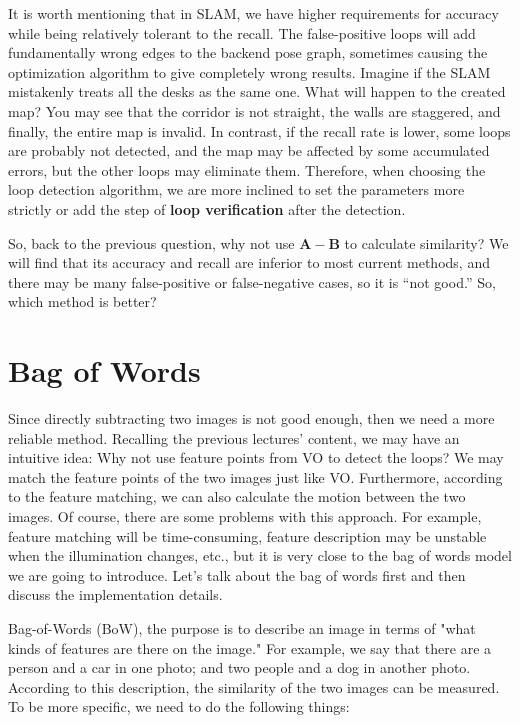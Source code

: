 It is worth mentioning that in SLAM, we have higher requirements for accuracy while being relatively tolerant to the recall. The false-positive loops will add fundamentally wrong edges to the backend pose graph, sometimes causing the optimization algorithm to give completely wrong results. Imagine if the SLAM mistakenly treats all the desks as the same one. What will happen to the created map? You may see that the corridor is not straight, the walls are staggered, and finally, the entire map is invalid. In contrast, if the recall rate is lower, some loops are probably not detected, and the map may be affected by some accumulated errors, but the other loops may eliminate them. Therefore, when choosing the loop detection algorithm, we are more inclined to set the parameters more strictly or add the step of \textbf{loop verification} after the detection.

So, back to the previous question, why not use $\mathbf{A}-\mathbf{B}$ to calculate similarity? We will find that its accuracy and recall are inferior to most current methods, and there may be many false-positive or false-negative cases, so it is ``not good.'' So, which method is better?

\section{Bag of Words}
Since directly subtracting two images is not good enough, then we need a more reliable method. Recalling the previous lectures' content, we may have an intuitive idea: Why not use feature points from VO to detect the loops? We may match the feature points of the two images just like VO. Furthermore, according to the feature matching, we can also calculate the motion between the two images. Of course, there are some problems with this approach. For example, feature matching will be time-consuming, feature description may be unstable when the illumination changes, etc., but it is very close to the bag of words model we are going to introduce. Let's talk about the bag of words first and then discuss the implementation details.

Bag-of-Words (BoW), the purpose is to describe an image in terms of "what kinds of features are there on the image." For example, we say that there are a person and a car in one photo; and two people and a dog in another photo. According to this description, the similarity of the two images can be measured. To be more specific, we need to do the following things:


